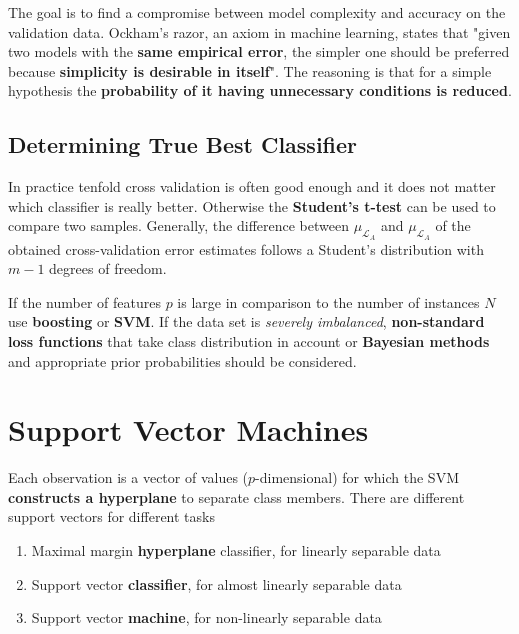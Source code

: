 \documentclass[11pt]{article}
\theoremstyle{definition}
\begin{document}
The goal is to find a compromise between model complexity and accuracy on the validation data. Ockham's razor, an axiom in machine learning, states that "given two models with the \textbf{same empirical error}, the simpler one should be preferred because \textbf{simplicity is desirable in itself}". The reasoning is that for a simple hypothesis the \textbf{probability of it having unnecessary conditions is reduced}.

\subsection{Determining True Best Classifier}
In practice tenfold cross validation is often good enough and it does not matter which classifier is really better. Otherwise the \textbf{Student's t-test} can be used to compare two samples. Generally, the difference between $\mu_{\mathcal{L}_A}$ and $\mu_{\mathcal{L}_A}$ of the obtained cross-validation error estimates follows a Student's distribution with $m-1$ degrees of freedom.

If the number of features $p$ is large in comparison to the number of instances $N$ use \textbf{boosting} or \textbf{SVM}. If the data set is \emph{severely imbalanced}, \textbf{non-standard loss functions} that take class distribution in account or \textbf{Bayesian methods} and appropriate prior probabilities should be considered.

\section{Support Vector Machines}

Each observation is a vector of values ($p$-dimensional) for which the SVM \textbf{constructs a hyperplane} to separate class members. There are different support vectors for different tasks
\begin{enumerate}
	\item Maximal margin \textbf{hyperplane} classifier, for linearly separable data
	\item Support vector \textbf{classifier}, for almost linearly separable data
	\item Support vector \textbf{machine}, for non-linearly separable data
\end{enumerate}
\end{document}
